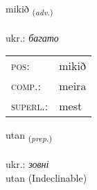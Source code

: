 \documentclass[frontgrid, backgrid]{flacards}\usepackage[]{graphicx}\usepackage[]{xcolor}
\begin{document}
\renewcommand{\flhead}{\vskip5pt \fboxsep=0pt {\small\bfseries\footnotesize Atviksorð | прислівник}}
\renewcommand{\fcfoot}{\vskip5pt \fboxsep=0pt \hspace{2pt}{\small\bfseries\footnotesize 1K}}

\renewcommand{\blhead}{\vskip5pt {\small\bfseries\footnotesize Atviksorð | прислівник }}
\renewcommand{\bcfoot}{\vskip5pt \hspace{2pt}{\small\bfseries\footnotesize 1K}}


{mikið \small{\textsubscript{(\textit{adv.})}} \\[1ex] %
\textphonetic{[mɪːcɪð]} \\
ukr.: \emph{багато} \\  [2ex]
\renewcommand*{\arraystretch}{0.8}
\begin{tabular}{ll}
\textsc{pos}: & mikið \\ 
\textsc{comp.}: & meira \\ 
\textsc{superl.}: & mest \\
\end{tabular}
}


\renewcommand{\flhead}{\vskip5pt \fboxsep=0pt {\small\bfseries\footnotesize Forsetning | прийменник}}
\renewcommand{\fcfoot}{\vskip5pt \fboxsep=0pt \hspace{2pt}{\small\bfseries\footnotesize 1K}}

\renewcommand{\blhead}{\vskip5pt {\small\bfseries\footnotesize Forsetning | прийменник }}
\renewcommand{\bcfoot}{\vskip5pt \hspace{2pt}{\small\bfseries\footnotesize 1K}}


{utan \small{\textsubscript{(\textit{prep.})}} \\[1ex]
\textphonetic{[ʏːtan]} \\
ukr.: \emph{зовні} \\  [2ex]
utan (Indeclinable)}

\renewcommand{\flhead}{\vskip5pt \fboxsep=0pt {\small\bfseries\footnotesize Nafnorð | іменник}}
\renewcommand{\fcfoot}{\vskip5pt \fboxsep=0pt \hspace{2pt}{\small\bfseries\footnotesize 1K}}
\end{document}
